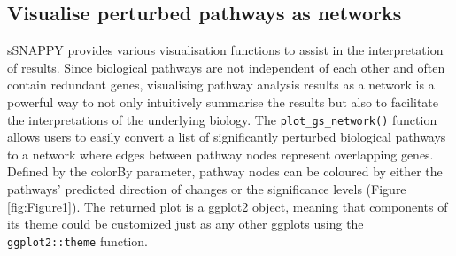 \documentclass[9pt,a4paper,]{extarticle}
\newenvironment{Shaded}{\begin{snugshade}}{\end{snugshade}}
\newcommand{\AttributeTok}[1]{\textcolor[rgb]{0.77,0.63,0.00}{#1}}
\newcommand{\DecValTok}[1]{\textcolor[rgb]{0.00,0.00,0.81}{#1}}
\newcommand{\FunctionTok}[1]{\textcolor[rgb]{0.00,0.00,0.00}{#1}}
\newcommand{\NormalTok}[1]{#1}
\newcommand{\OtherTok}[1]{\textcolor[rgb]{0.56,0.35,0.01}{#1}}
\newcommand{\SpecialCharTok}[1]{\textcolor[rgb]{0.00,0.00,0.00}{#1}}
\newcommand{\StringTok}[1]{\textcolor[rgb]{0.31,0.60,0.02}{#1}}
\begin{document}
\begin{Shaded}
\end{Shaded}

\hypertarget{visualise-perturbed-pathways-as-networks}{%
\subsection{Visualise perturbed pathways as networks}\label{visualise-perturbed-pathways-as-networks}}

sSNAPPY provides various visualisation functions to assist in the interpretation of results. Since biological pathways are not independent of each other and often contain redundant genes, visualising pathway analysis results as a network is a powerful way to not only intuitively summarise the results but also to facilitate the interpretations of the underlying biology. The \texttt{plot\_gs\_network()} function allows users to easily convert a list of significantly perturbed biological pathways to a network where edges between pathway nodes represent overlapping genes. Defined by the colorBy parameter, pathway nodes can be coloured by either the pathways' predicted direction of changes or the significance levels (Figure \ref{fig:Figure1}). The returned plot is a ggplot2 \citep{Wickham2009} object, meaning that components of its theme could be customized just as any other ggplots using the \texttt{ggplot2::theme} function.
\end{document}
